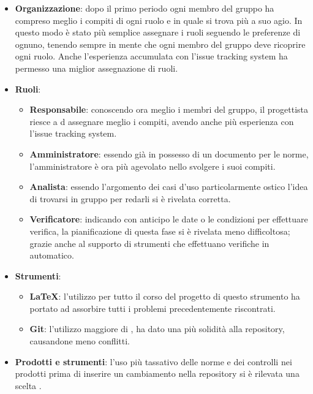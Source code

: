     \begin{itemize}
        \item \textbf{Organizzazione}: dopo il primo periodo ogni membro del gruppo ha compreso meglio i compiti di ogni ruolo e in quale si trova più a suo agio. In questo modo è stato più semplice assegnare i ruoli seguendo le preferenze di ognuno, tenendo sempre in mente che ogni membro del gruppo deve ricoprire ogni ruolo. Anche l'esperienza accumulata con l'issue tracking system ha permesso una miglior assegnazione di ruoli.
        \item \textbf{Ruoli}:
            \begin{itemize}
                \item \textbf{Responsabile}: conoscendo ora meglio i membri del gruppo, il progettista riesce a d assegnare meglio i compiti, avendo anche più esperienza con l'issue tracking system.
                \item \textbf{Amministratore}: essendo già in possesso di un documento per le norme, l'amministratore è ora più agevolato nello svolgere i suoi compiti.
                \item \textbf{Analista}: essendo l'argomento dei casi d'uso particolarmente ostico l'idea di trovarsi in gruppo per redarli si è rivelata corretta.
                \item \textbf{Verificatore}: indicando con anticipo le date o le condizioni per effettuare verifica, la pianificazione di questa fase si è rivelata meno difficoltosa; grazie anche al supporto di strumenti che effettuano verifiche in automatico.
            \end{itemize}
        \item \textbf{Strumenti}:
            \begin{itemize}
                \item \textbf{\LaTeX}: l'utilizzo per tutto il corso del progetto di questo strumento ha portato ad assorbire tutti i problemi precedentemente riscontrati.
                \item \textbf{Git}: l'utilizzo maggiore di , ha dato una più solidità alla repository, causandone meno conflitti.
            \end{itemize}
        \item \textbf{Prodotti e strumenti}: l'uso più tassativo delle norme e dei controlli nei prodotti prima di inserire un cambiamento nella repository si è rilevata una scelta .
    \end{itemize}
    
